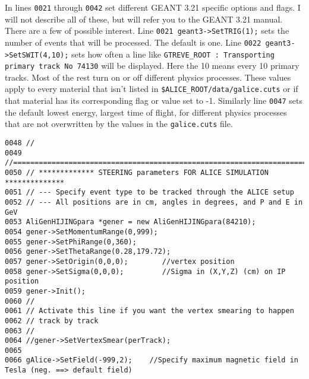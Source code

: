 In lines \texttt{0021} through \texttt{0042} set different GEANT 3.21 specific
options and flags. I will not describe all of these, but will refer you to the
GEANT 3.21 manual. There are a few of possible interest. Line 
\texttt{0021 geant3->SetTRIG(1);} sets the number of events that will be
processed. The default is one. Line \texttt{0022 geant3->SetSWIT(4,10);} sets
how often a line like 
\texttt{GTREVE\_ROOT : Transporting primary track No 74130} will be
displayed. Here the 10 means every 10 primary tracks. Most of the rest turn on
or off different physics processes. These values apply to every material that
isn't listed in \texttt{\$ALICE\_ROOT/data/galice.cuts} or if that material has
its corresponding flag or value set to -1. Similarly line \texttt{0047} sets
the default lowest energy, largest time of flight, for different physics
processes that are not overwritten by the values in the \texttt{galice.cuts}
file.

\scriptsize
\begin{verbatim}
0048 //
0049 //=======================================================================
0050 // ************* STEERING parameters FOR ALICE SIMULATION **************
0051 // --- Specify event type to be tracked through the ALICE setup
0052 // --- All positions are in cm, angles in degrees, and P and E in GeV
0053 AliGenHIJINGpara *gener = new AliGenHIJINGpara(84210);
0054 gener->SetMomentumRange(0,999);
0055 gener->SetPhiRange(0,360);
0056 gener->SetThetaRange(0.28,179.72);
0057 gener->SetOrigin(0,0,0);        //vertex position
0058 gener->SetSigma(0,0,0);         //Sigma in (X,Y,Z) (cm) on IP position
0059 gener->Init();
0060 // 
0061 // Activate this line if you want the vertex smearing to happen
0062 // track by track
0063 //
0064 //gener->SetVertexSmear(perTrack); 
0065 
0066 gAlice->SetField(-999,2);    //Specify maximum magnetic field in Tesla (neg. ==> default field)
\end{verbatim}
\normalsize

